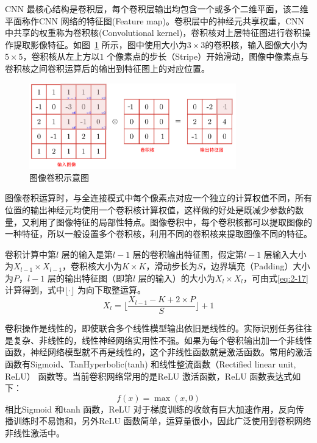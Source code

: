 CNN 最核心结构是卷积层，每个卷积层输出均包含一个或多个二维平面，该二维平面称作CNN 网络的特征图(Feature map)。卷积层中的神经元共享权重，CNN 中共享的权重称为卷积核(Convolutional kernel)，卷积核对上层特征图进行卷积操作提取影像特征。如图~\ref{fig:conv_op} 所示，图中使用大小为$3\times3$的卷积核，输入图像大小为$5\times5$，卷积核从左上方以$1$ 个像素点的步长（Stripe）开始滑动，图像中像素点与卷积核之间卷积运算后的输出到特征图上的对应位置。


\begin{figure}[htbp]
  \centering
  \includegraphics[width=0.8\textwidth]{figures/conv_op}
  \caption{图像卷积示意图}\label{fig:conv_op}
\end{figure}

图像卷积运算时，与全连接模式中每个像素点对应一个独立的计算权值不同，所有位置的输出神经元均使用一个卷积核计算权值，这样做的好处是既减少参数的数量，又利用了图像特征的局部性特点。图像卷积中，每个卷积核都可以提取图像的一种特征，所以一般设置多个卷积核，利用不同的卷积核来提取图像不同的特征。

卷积计算中第$l$ 层的输入是第$l-1$ 层的卷积输出特征图，假定第$l-1$ 层输入大小为$X_{l-1} \times X_{l-1}$，卷积核大小为$K \times K$，滑动步长为$S$，边界填充（Padding）大小为$P$，$l-1$ 层的输出特征图（即第$l$ 层的输入）的大小为$X_l \times X_l$，可由式\ref{eq:2-17} 计算得到，式中$\lfloor \cdot \rfloor$ 为向下取整运算。
\begin{equation}
  \label{eq:2-17}
  X_l = \lfloor \frac{X_{l-1} - K + 2 \times P}{S} \rfloor + 1
\end{equation}

卷积操作是线性的，即使联合多个线性模型输出依旧是线性的。实际识别任务往往是复杂、非线性的，线性神经网络实用性不强。如果为每个卷积输出加一个非线性函数，神经网络模型就不再是线性的，这个非线性函数就是激活函数。常用的激活函数有Sigmoid、TanHyperbolic(tanh) 和线性整流函数（Rectified linear unit, ReLU） 函数等。当前卷积网络常用的是ReLU 激活函数，ReLU 函数表达式如下：
\begin{equation}
  \label{eq:2-17-1}
  f(x) = \max(x,0)
\end{equation}
相比Sigmoid 和tanh 函数，ReLU 对于梯度训练的收敛有巨大加速作用，反向传播训练时不易饱和，另外ReLU 函数简单，运算量很小，因此广泛使用到卷积网络非线性激活中。

